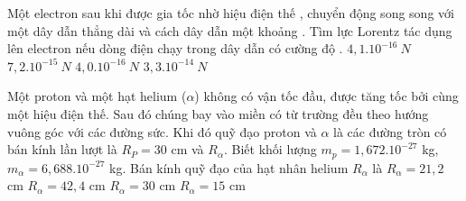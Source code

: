 \begin{vidu} %
Một electron sau khi được gia tốc nhờ hiệu điện thế , chuyển động song song với một dây dẫn thẳng dài và cách dây dẫn một khoảng . Tìm lực Lorentz tác dụng lên electron nếu dòng điện chạy trong dây dẫn có cường độ .
\choice
{\True $4,1.10^{-16}\ N$}
{$7,2.10^{-15}\ N$}
{$4,0.10^{-16}\ N$}
{$3,3.10^{-14}\ N$}
\end{vidu}
\begin{vidu} %
	Một proton và một hạt helium ($\alpha$) không có vận tốc đầu, được tăng tốc bởi cùng một hiệu điện thế. Sau đó chúng bay vào miền có từ trường đều theo hướng vuông góc với các đường sức. Khi đó quỹ đạo proton và $\alpha$ là các đường tròn có bán kính lần lượt là $R_P = 30$ cm và $R_\alpha$. Biết khối lượng $m_p = 1,672. 10^{-27}$ kg, $m_\alpha = 6,688. 10^{-27}$ kg. Bán kính quỹ đạo của hạt nhân helium $R_\alpha$ là
	\choice
	{$R_\alpha = 21,2$ cm}
	{\True $R_\alpha = 42,4$ cm}
	{$R_\alpha = 30$ cm}
	{$R_\alpha = 15$ cm}
\end{vidu}
